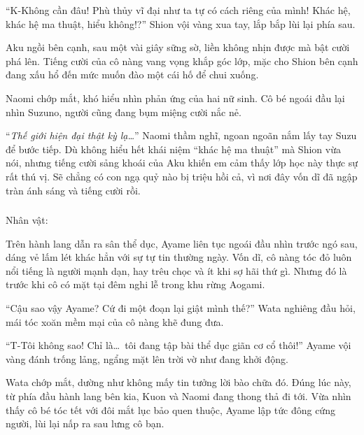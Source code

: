 \documentclass[../main.tex]{subfiles}
\begin{document}
``K-Không cần đâu! Phù thủy vĩ đại như ta tự có cách riêng của mình! Khác hệ, khác hệ ma thuật, hiểu không!?'' Shion vội vàng xua tay, lắp bắp lùi lại phía sau.

Aku ngồi bên cạnh, sau một vài giây sững sờ, liền không nhịn được mà bật cười phá lên. Tiếng cười của cô nàng vang vọng khắp góc lớp, mặc cho Shion bên cạnh đang xấu hổ đến mức muốn đào một cái hố để chui xuống.

Naomi chớp mắt, khó hiểu nhìn phản ứng của hai nữ sinh. Cô bé ngoái đầu lại nhìn Suzuno, người cũng đang bụm miệng cười nắc nẻ.

``\textit{Thế giới hiện đại thật kỳ lạ\dots}'' Naomi thầm nghĩ, ngoan ngoãn nắm lấy tay Suzu để bước tiếp. Dù không hiểu hết khái niệm ``khác hệ ma thuật'' mà Shion vừa nói, nhưng tiếng cười sảng khoái của Aku khiến em cảm thấy lớp học này thực sự rất thú vị. Sẽ chẳng có con ngạ quỷ nào bị triệu hồi cả, vì nơi đây vốn dĩ đã ngập tràn ánh sáng và tiếng cười rồi.

\newpage

\subsubsection*{\label{ep-ER5}}
\begin{center}{\caviar Nhân vật:  }\end{center}

Trên hành lang dẫn ra sân thể dục, Ayame liên tục ngoái đầu nhìn trước ngó sau, dáng vẻ lấm lét khác hẳn với sự tự tin thường ngày. Vốn dĩ, cô nàng tóc đỏ luôn nổi tiếng là người mạnh dạn, hay trêu chọc và ít khi sợ hãi thứ gì. Nhưng đó là trước khi cô có mặt tại đêm nghi lễ trong khu rừng Aogami.

``Cậu sao vậy Ayame? Cứ đi một đoạn lại giật mình thế?'' Wata nghiêng đầu hỏi, mái tóc xoăn mềm mại của cô nàng khẽ đung đưa.

``T-Tôi không sao! Chỉ là\dots\ tôi đang tập bài thể dục giãn cơ cổ thôi!'' Ayame vội vàng đánh trống lảng, ngẩng mặt lên trời vờ như đang khởi động.

Wata chớp mắt, dường như không mấy tin tưởng lời bào chữa đó. Đúng lúc này, từ phía đầu hành lang bên kia, Kuon và Naomi đang thong thả đi tới. Vừa nhìn thấy cô bé tóc tết với đôi mắt lục bảo quen thuộc, Ayame lập tức đông cứng người, lùi lại nấp ra sau lưng cô bạn.
\end{document}
